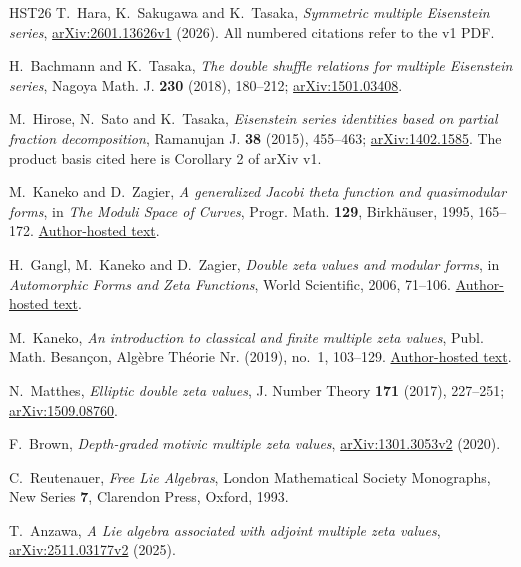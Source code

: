 \documentclass[12pt]{amsart}
\theoremstyle{definition}
\theoremstyle{remark}
\numberwithin{equation}{section}
\numberwithin{equation}{section}
\begin{document}
\renewcommand{\refname}{参考文献}
\begin{thebibliography}{HST26}
T.~Hara, K.~Sakugawa and K.~Tasaka,
\emph{Symmetric multiple Eisenstein series},
\href{https://arxiv.org/abs/2601.13626}{arXiv:2601.13626v1} (2026).
All numbered citations refer to the v1 PDF.

H.~Bachmann and K.~Tasaka,
\emph{The double shuffle relations for multiple Eisenstein series},
Nagoya Math. J. \textbf{230} (2018), 180--212;
\href{https://arxiv.org/abs/1501.03408}{arXiv:1501.03408}.

M.~Hirose, N.~Sato and K.~Tasaka,
\emph{Eisenstein series identities based on partial fraction decomposition},
Ramanujan J. \textbf{38} (2015), 455--463;
\href{https://arxiv.org/abs/1402.1585}{arXiv:1402.1585}.
The product basis cited here is Corollary 2 of arXiv v1.

M.~Kaneko and D.~Zagier,
\emph{A generalized Jacobi theta function and quasimodular forms},
in \emph{The Moduli Space of Curves}, Progr. Math. \textbf{129},
Birkh\"auser, 1995, 165--172.
\href{https://www2.math.kyushu-u.ac.jp/~mkaneko/papers/12quasimodular.pdf}{Author-hosted text}.

H.~Gangl, M.~Kaneko and D.~Zagier,
\emph{Double zeta values and modular forms},
in \emph{Automorphic Forms and Zeta Functions}, World Scientific, 2006, 71--106.
\href{https://www2.math.kyushu-u.ac.jp/~mkaneko/papers/35Double_zeta_values.pdf}{Author-hosted text}.

M.~Kaneko, \emph{An introduction to classical and finite multiple zeta values},
Publ. Math. Besan\c{c}on, Alg\`ebre Th\'eorie Nr. (2019), no.~1, 103--129.
\href{https://www2.math.kyushu-u.ac.jp/~mkaneko/papers/Lyon_Proc_rev.pdf}{Author-hosted text}.

N.~Matthes, \emph{Elliptic double zeta values},
J. Number Theory \textbf{171} (2017), 227--251;
\href{https://arxiv.org/abs/1509.08760}{arXiv:1509.08760}.

F.~Brown, \emph{Depth-graded motivic multiple zeta values},
\href{https://arxiv.org/abs/1301.3053}{arXiv:1301.3053v2} (2020).

C.~Reutenauer, \emph{Free Lie Algebras},
London Mathematical Society Monographs, New Series \textbf{7},
Clarendon Press, Oxford, 1993.

T.~Anzawa, \emph{A Lie algebra associated with adjoint multiple zeta values},
\href{https://arxiv.org/abs/2511.03177}{arXiv:2511.03177v2} (2025).


\end{thebibliography}
\end{document}
